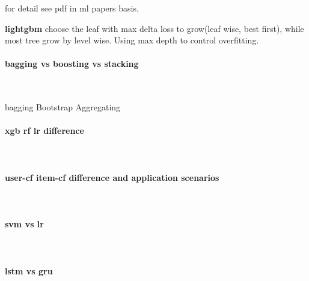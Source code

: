 \documentclass{article}
\begin{document}
for detail see pdf in ml papers basis.

\textbf{lightgbm} choose the leaf with max delta loss to grow(leaf wise, best first), while most tree grow by level wise. Using max depth to control overfitting.

\paragraph{bagging vs boosting vs stacking}~{}

bagging Bootstrap Aggregating 
\paragraph{xgb rf lr difference}~{}
\paragraph{user-cf item-cf difference and application scenarios}~{}
\paragraph{svm vs lr}~{}
\paragraph{lstm vs gru}~{}



\end{document}
